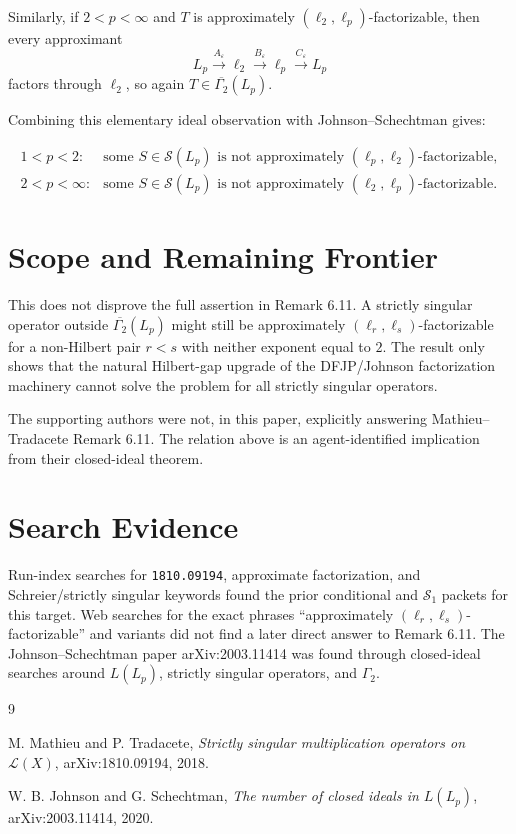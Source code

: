 \documentclass[11pt]{article}
\newcommand{\SSing}{\mathcal S}
\newcommand{\GammaTwo}{\Gamma_2}
\begin{document}
Similarly, if $2<p<\infty$ and $T$ is approximately
$(\ell_2,\ell_p)$-factorizable, then every approximant
\[
  L_p \xrightarrow{A_\varepsilon} \ell_2
      \xrightarrow{B_\varepsilon} \ell_p
      \xrightarrow{C_\varepsilon} L_p
\]
factors through $\ell_2$, so again $T\in\overline{\GammaTwo}(L_p)$.

Combining this elementary ideal observation with Johnson--Schechtman gives:

\[
\begin{array}{ll}
1<p<2: & \text{some }S\in\SSing(L_p)\text{ is not approximately }
        (\ell_p,\ell_2)\text{-factorizable},\\[3pt]
2<p<\infty: & \text{some }S\in\SSing(L_p)\text{ is not approximately }
        (\ell_2,\ell_p)\text{-factorizable}.
\end{array}
\]

\section*{Scope and Remaining Frontier}

This does not disprove the full assertion in Remark 6.11.  A strictly singular
operator outside $\overline{\GammaTwo}(L_p)$ might still be approximately
$(\ell_r,\ell_s)$-factorizable for a non-Hilbert pair $r<s$ with neither
exponent equal to $2$.  The result only shows that the natural Hilbert-gap
upgrade of the DFJP/Johnson factorization machinery cannot solve the problem
for all strictly singular operators.

The supporting authors were not, in this paper, explicitly answering
Mathieu--Tradacete Remark 6.11.  The relation above is an agent-identified
implication from their closed-ideal theorem.

\section*{Search Evidence}

Run-index searches for \texttt{1810.09194}, approximate factorization, and
Schreier/strictly singular keywords found the prior conditional and
$\mathcal S_1$ packets for this target.  Web searches for the exact phrases
``approximately $(\ell_r,\ell_s)$-factorizable'' and variants did not find a
later direct answer to Remark 6.11.  The Johnson--Schechtman paper
arXiv:2003.11414 was found through closed-ideal searches around
$L(L_p)$, strictly singular operators, and $\Gamma_2$.

\begin{thebibliography}{9}

M. Mathieu and P. Tradacete,
\emph{Strictly singular multiplication operators on $\mathcal L(X)$},
arXiv:1810.09194, 2018.

W. B. Johnson and G. Schechtman,
\emph{The number of closed ideals in $L(L_p)$},
arXiv:2003.11414, 2020.

\end{thebibliography}
\end{document}
